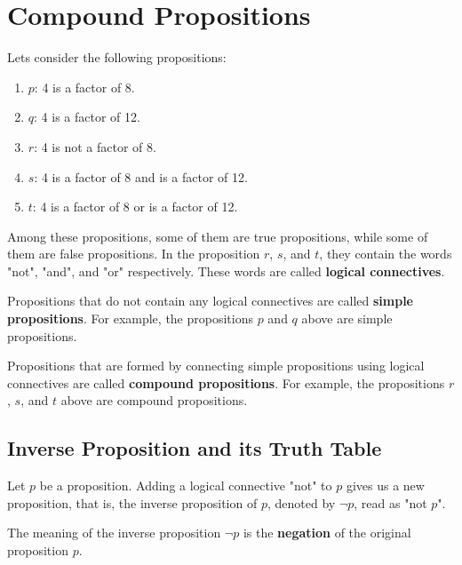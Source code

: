 \documentclass{report}
\begin{document}
\section{Compound Propositions}

Lets consider the following propositions:
\begin{enumerate}[label=]
    \item $p$: 4 is a factor of 8.
    \item $q$: 4 is a factor of 12.
    \item $r$: 4 is not a factor of 8.
    \item $s$: 4 is a factor of 8 and is a factor of 12.
    \item $t$: 4 is a factor of 8 or is a factor of 12.
\end{enumerate}

Among these propositions, some of them are true propositions, while some of
them are false propositions. In the proposition $r$, $s$, and $t$, they contain
the words "not", "and", and "or" respectively. These words are called
\textbf{logical connectives}.

Propositions that do not contain any logical connectives are called
\textbf{simple propositions}. For example, the propositions $p$ and $q$ above
are simple propositions.

Propositions that are formed by connecting simple propositions using logical
connectives are called \textbf{compound propositions}. For example, the
propositions $r$, $s$, and $t$ above are compound propositions.

\subsection*{Inverse Proposition and its Truth Table}

Let $p$ be a proposition. Adding a logical connective "not" to $p$ gives us a
new proposition, that is, the inverse proposition of $p$, denoted by $\neg p$,
read as "not $p$".

The meaning of the inverse proposition $\neg p$ is the \textbf{negation} of the
original proposition $p$.
\end{document}
